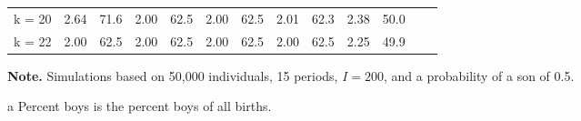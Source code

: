 \documentclass[12pt,letterpaper]{article}
\begin{document}
\begin{table}[!htp]
\begin{threeparttable}
\begin{tabular}{@{} c D{.}{.}{1.2} D{.}{.}{1.2} D{.}{.}{1.2} D{.}{.}{2.2} D{.}{.}{1.2} D{.}{.}{1.2} D{.}{.}{2.2} D{.}{.}{1.2} D{.}{.}{1.2} D{.}{.}{2.2} D{.}{.}{1.2} D{.}{.}{1.2} @{}}
 k = 20        &  2.64 &  71.6 &  2.00 &  62.5 &  2.00 &  62.5 &  2.01 &  62.3 &  2.38 &  50.0 \\
 k = 22        &  2.00 &  62.5 &  2.00 &  62.5 &  2.00 &  62.5 &  2.00 &  62.5 &  2.25 &  49.9 \\
\bottomrule
\end{tabular}
\begin{tablenotes} \scriptsize
\item \hspace*{-0.5em} \textbf{Note.} Simulations based on  50,000 individuals, 15 periods, $ I = 200 $,
 and a probability of a son of 0.5.
\item[a]Percent boys is the percent boys of all births.
\end{tablenotes}
\end{threeparttable}
\normalsize
\end{table}
\end{document}
